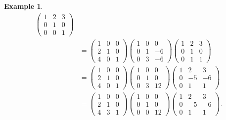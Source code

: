 \documentclass[12pt]{report}
\theoremstyle{plain}
\theoremstyle{remark}
\theoremstyle{definition}
\newtheorem{example}[theorem]{Example}
\begin{document}
\begin{example}
\begin{align*}
\begin{pmatrix}
            1 & 2 & 3 \\ 0 & 1 & 0 \\ 0 & 0 & 1
        \end{pmatrix} \\
        &= \begin{pmatrix}
            1 & 0 & 0 \\ 2 & 1 & 0 \\ 4 & 0 & 1
        \end{pmatrix} \begin{pmatrix}
            1 & 0 & 0 \\ 0 & 1 & -6 \\ 0 & 3 & -6
        \end{pmatrix} \begin{pmatrix}
            1 & 2 & 3 \\ 0 & 1 & 0 \\ 0 & 1 & 1
        \end{pmatrix} \\
        &= \begin{pmatrix}
            1 & 0 & 0 \\ 2 & 1 & 0 \\ 4 & 0 & 1
        \end{pmatrix} \begin{pmatrix}
            1 & 0 & 0 \\ 0 & 1 & 0 \\ 0 & 3 & 12
        \end{pmatrix} \begin{pmatrix}
            1 & 2 & 3 \\ 0 & -5 & -6 \\ 0 & 1 & 1
        \end{pmatrix} \\
        &= \begin{pmatrix}
            1 & 0 & 0 \\ 2 & 1 & 0 \\ 4 & 3 & 1
        \end{pmatrix} \begin{pmatrix}
            1 & 0 & 0 \\ 0 & 1 & 0 \\ 0 & 0 & 12
        \end{pmatrix} \begin{pmatrix}
            1 & 2 & 3 \\ 0 & -5 & -6 \\ 0 & 1 & 1
        \end{pmatrix}.
    \end{align*}
\end{example}
\end{document}
